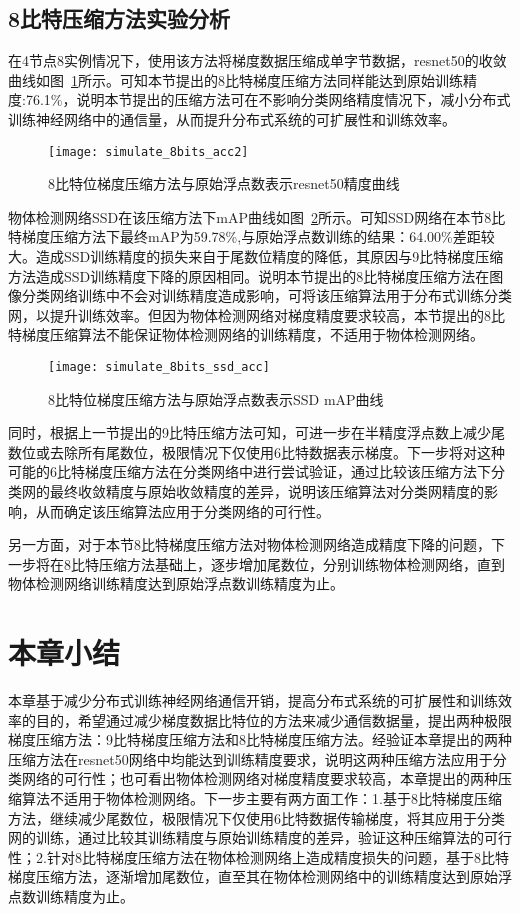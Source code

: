 \subsection{8比特压缩方法实验分析}
在4节点8实例情况下，使用该方法将梯度数据压缩成单字节数据，resnet50的收敛曲线如图~\ref{fig:simulate_8bits_acc}所示。可知本节提出的8比特梯度压缩方法同样能达到原始训练精度:76.1\%，说明本节提出的压缩方法可在不影响分类网络精度情况下，减小分布式训练神经网络中的通信量，从而提升分布式系统的可扩展性和训练效率。
\begin{figure}[htp]
\centering
\texttt{[image: simulate\_8bits\_acc2]}
\caption{8比特位梯度压缩方法与原始浮点数表示resnet50精度曲线}
\label{fig:simulate_8bits_acc}
\end{figure}

物体检测网络SSD在该压缩方法下mAP曲线如图~\ref{fig:simulate_8bits_ssd_acc}所示。可知SSD网络在本节8比特梯度压缩方法下最终mAP为59.78\%,与原始浮点数训练的结果：64.00\%差距较大。造成SSD训练精度的损失来自于尾数位精度的降低，其原因与9比特梯度压缩方法造成SSD训练精度下降的原因相同。说明本节提出的8比特梯度压缩方法在图像分类网络训练中不会对训练精度造成影响，可将该压缩算法用于分布式训练分类网，以提升训练效率。但因为物体检测网络对梯度精度要求较高，本节提出的8比特梯度压缩算法不能保证物体检测网络的训练精度，不适用于物体检测网络。
\begin{figure}[htp]
\centering
\texttt{[image: simulate\_8bits\_ssd\_acc]}
\caption{8比特位梯度压缩方法与原始浮点数表示SSD mAP曲线}
\label{fig:simulate_8bits_ssd_acc}
\end{figure}

同时，根据上一节提出的9比特压缩方法可知，可进一步在半精度浮点数上减少尾数位或去除所有尾数位，极限情况下仅使用6比特数据表示梯度。下一步将对这种可能的6比特梯度压缩方法在分类网络中进行尝试验证，通过比较该压缩方法下分类网的最终收敛精度与原始收敛精度的差异，说明该压缩算法对分类网精度的影响，从而确定该压缩算法应用于分类网络的可行性。

另一方面，对于本节8比特梯度压缩方法对物体检测网络造成精度下降的问题，下一步将在8比特压缩方法基础上，逐步增加尾数位，分别训练物体检测网络，直到物体检测网络训练精度达到原始浮点数训练精度为止。
\section{本章小结}
本章基于减少分布式训练神经网络通信开销，提高分布式系统的可扩展性和训练效率的目的，希望通过减少梯度数据比特位的方法来减少通信数据量，提出两种极限梯度压缩方法：9比特梯度压缩方法和8比特梯度压缩方法。经验证本章提出的两种压缩方法在resnet50网络中均能达到训练精度要求，说明这两种压缩方法应用于分类网络的可行性；也可看出物体检测网络对梯度精度要求较高，本章提出的两种压缩算法不适用于物体检测网络。下一步主要有两方面工作：1.基于8比特梯度压缩方法，继续减少尾数位，极限情况下仅使用6比特数据传输梯度，将其应用于分类网的训练，通过比较其训练精度与原始训练精度的差异，验证这种压缩算法的可行性；2.针对8比特梯度压缩方法在物体检测网络上造成精度损失的问题，基于8比特梯度压缩方法，逐渐增加尾数位，直至其在物体检测网络中的训练精度达到原始浮点数训练精度为止。







